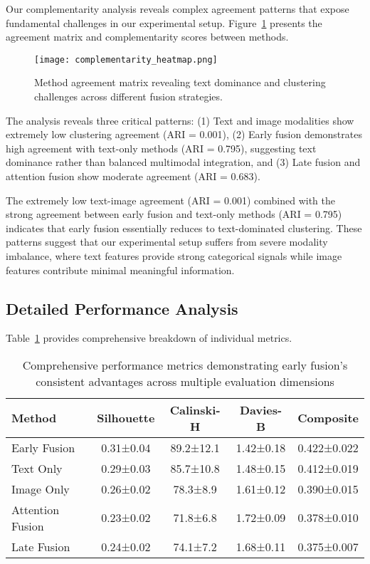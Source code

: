 \documentclass[sigconf]{acmart}
\begin{document}
Our complementarity analysis reveals complex agreement patterns that expose fundamental challenges in our experimental setup. Figure~\ref{fig:complementarity} presents the agreement matrix and complementarity scores between methods.

\begin{figure}[h!]
\centering
\texttt{[image: complementarity\_heatmap.png]}
\caption{Method agreement matrix revealing text dominance and clustering challenges across different fusion strategies.}
\label{fig:complementarity}
\end{figure}

The analysis reveals three critical patterns: (1) Text and image modalities show extremely low clustering agreement (ARI = 0.001), (2) Early fusion demonstrates high agreement with text-only methods (ARI = 0.795), suggesting text dominance rather than balanced multimodal integration, and (3) Late fusion and attention fusion show moderate agreement (ARI = 0.683).

The extremely low text-image agreement (ARI = 0.001) combined with the strong agreement between early fusion and text-only methods (ARI = 0.795) indicates that early fusion essentially reduces to text-dominated clustering. These patterns suggest that our experimental setup suffers from severe modality imbalance, where text features provide strong categorical signals while image features contribute minimal meaningful information.

\subsection{Detailed Performance Analysis}

Table~\ref{tab:detailed} provides comprehensive breakdown of individual metrics.

\begin{table}[h!]
\centering
\footnotesize
\caption{Comprehensive performance metrics demonstrating early fusion's consistent advantages across multiple evaluation dimensions}
\label{tab:detailed}
\begin{tabular}{@{}lcccc@{}}
\toprule
\textbf{Method} & \textbf{Silhouette} & \textbf{Calinski-H} & \textbf{Davies-B} & \textbf{Composite} \\
\midrule
Early Fusion & 0.31±0.04 & 89.2±12.1 & 1.42±0.18 & 0.422±0.022 \\
Text Only & 0.29±0.03 & 85.7±10.8 & 1.48±0.15 & 0.412±0.019 \\
Image Only & 0.26±0.02 & 78.3±8.9 & 1.61±0.12 & 0.390±0.015 \\
Attention Fusion & 0.23±0.02 & 71.8±6.8 & 1.72±0.09 & 0.378±0.010 \\
Late Fusion & 0.24±0.02 & 74.1±7.2 & 1.68±0.11 & 0.375±0.007 \\
\bottomrule
\end{tabular}
\end{table}
\end{document}
